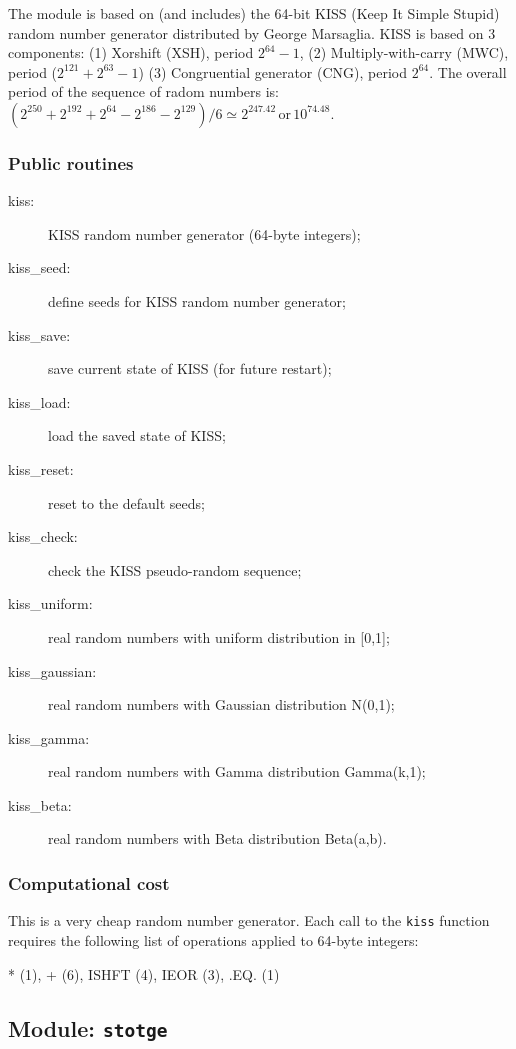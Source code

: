 \documentclass[11pt]{article}
\begin{document}
The module is based on (and includes) the
64-bit KISS (Keep It Simple Stupid) random number generator
distributed by George Marsaglia.
KISS is based on 3 components:
(1) Xorshift (XSH), period $2^{64}-1$,
(2) Multiply-with-carry (MWC), period ($2^{121}+2^{63}-1$)
(3) Congruential generator (CNG), period $2^{64}$.
The overall period of the sequence of radom numbers is:
$(2^{250}+2^{192}+2^{64}-2^{186}-2^{129})/6 \simeq 2^{247.42} \,\mbox{or}\, 10^{74.48}$.

\subsubsection*{Public routines}

\begin{description}
\item[kiss:] KISS random number generator (64-byte integers);
\item[kiss\_seed:] define seeds for KISS random number generator;
\item[kiss\_save:] save current state of KISS (for future restart);
\item[kiss\_load:] load the saved state of KISS;
\item[kiss\_reset:] reset to the default seeds;
\item[kiss\_check:] check the KISS pseudo-random sequence;
\item[kiss\_uniform:] real random numbers with uniform distribution in [0,1];
\item[kiss\_gaussian:] real random numbers with Gaussian distribution N(0,1);
\item[kiss\_gamma:] real random numbers with Gamma distribution Gamma(k,1);
\item[kiss\_beta:] real random numbers with Beta distribution Beta(a,b).
\end{description}

\subsubsection*{Computational cost}

This is a very cheap random number generator.
Each call to the {\tt kiss} function requires
the following list of operations
applied to 64-byte integers:

\centerline{* (1), + (6), ISHFT (4), IEOR (3), .EQ. (1)}

\subsection{Module: {\tt\bf stotge}}
\end{document}

